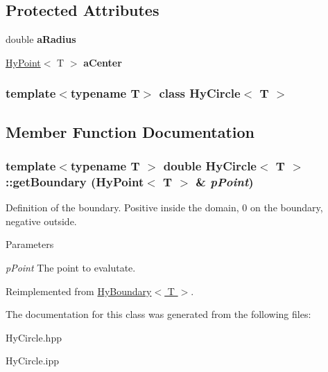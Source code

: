 \subsection*{Protected Attributes}
\begin{DoxyCompactItemize}
\item 
\hypertarget{classHyCircle_a7df9d0c4404401ba9f661aad0bd7bc6e}{
double {\bfseries aRadius}}
\label{classHyCircle_a7df9d0c4404401ba9f661aad0bd7bc6e}

\item 
\hypertarget{classHyCircle_adf84a8e946e0fb915d313ba0051c5b23}{
\hyperlink{classHyPoint}{HyPoint}$<$ T $>$ {\bfseries aCenter}}
\label{classHyCircle_adf84a8e946e0fb915d313ba0051c5b23}

\end{DoxyCompactItemize}
\subsubsection*{template$<$typename T$>$ class HyCircle$<$ T $>$}



\subsection{Member Function Documentation}
\hypertarget{classHyCircle_aed6e84c3e2e99b8f84aa1b723224f4c5}{
\subsubsection[{getBoundary}]{\setlength{\rightskip}{0pt plus 5cm}template$<$typename T $>$ double {\bf HyCircle}$<$ T $>$::getBoundary ({\bf HyPoint}$<$ T $>$ \& {\em pPoint})}}
\label{classHyCircle_aed6e84c3e2e99b8f84aa1b723224f4c5}


Definition of the boundary. Positive inside the domain, 0 on the boundary, negative outside. 


\begin{DoxyParams}{Parameters}
\item[{\em pPoint}]The point to evalutate. \end{DoxyParams}


Reimplemented from \hyperlink{classHyBoundary_a138c96a97075dc41eead25963c1bf785}{HyBoundary$<$ T $>$}.



The documentation for this class was generated from the following files:\begin{DoxyCompactItemize}
\item 
HyCircle.hpp\item 
HyCircle.ipp\end{DoxyCompactItemize}
